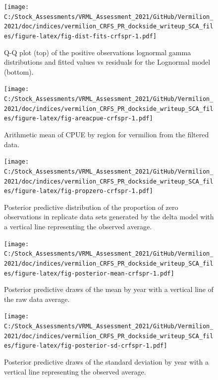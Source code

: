 \documentclass[
  english,
  a4paper,
]{article}
\begin{document}
\FloatBarrier

\FloatBarrier

\begin{figure}
\centering
\texttt{[image: C:/Stock\_Assessments/VRML\_Assessment\_2021/GitHub/Vermilion\_2021/doc/indices/vermilion\_CRFS\_PR\_dockside\_writeup\_SCA\_files/figure-latex/fig-dist-fits-crfspr-1.pdf]}
\caption{\label{fig:fig-dist-fits-crfspr}Q-Q plot (top) of the positive observations lognormal gamma distributions and fitted values vs residuals for the Lognormal model (bottom).}
\end{figure}

\begin{figure}
\centering
\texttt{[image: C:/Stock\_Assessments/VRML\_Assessment\_2021/GitHub/Vermilion\_2021/doc/indices/vermilion\_CRFS\_PR\_dockside\_writeup\_SCA\_files/figure-latex/fig-areacpue-crfspr-1.pdf]}
\caption{\label{fig:fig-areacpue-crfspr}Arithmetic mean of CPUE by region for vermilion from the filtered data.}
\end{figure}

\begin{figure}
\centering
\texttt{[image: C:/Stock\_Assessments/VRML\_Assessment\_2021/GitHub/Vermilion\_2021/doc/indices/vermilion\_CRFS\_PR\_dockside\_writeup\_SCA\_files/figure-latex/fig-propzero-crfspr-1.pdf]}
\caption{\label{fig:fig-propzero-crfspr}Posterior predictive distribution of the proportion of zero observations in replicate data sets generated by the delta model with a vertical line representing the observed average.}
\end{figure}

\begin{figure}
\centering
\texttt{[image: C:/Stock\_Assessments/VRML\_Assessment\_2021/GitHub/Vermilion\_2021/doc/indices/vermilion\_CRFS\_PR\_dockside\_writeup\_SCA\_files/figure-latex/fig-posterior-mean-crfspr-1.pdf]}
\caption{\label{fig:fig-posterior-mean-crfspr}Posterior predictive draws of the mean by year with a vertical line of the raw data average.}
\end{figure}

\begin{figure}
\centering
\texttt{[image: C:/Stock\_Assessments/VRML\_Assessment\_2021/GitHub/Vermilion\_2021/doc/indices/vermilion\_CRFS\_PR\_dockside\_writeup\_SCA\_files/figure-latex/fig-posterior-sd-crfspr-1.pdf]}
\caption{\label{fig:fig-posterior-sd-crfspr}Posterior predictive draws of the standard deviation by year with a vertical line representing the observed average.}
\end{figure}
\end{document}
